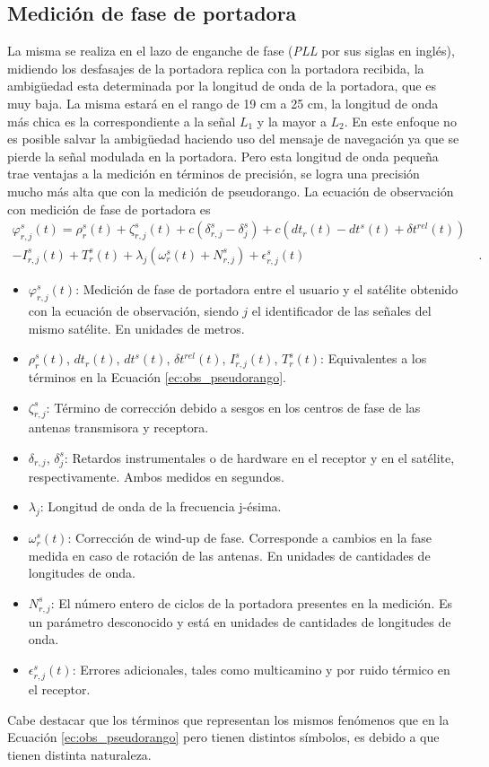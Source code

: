 \documentclass[a4paper,12pt,oneside,onecolumn,final,openright]{book}%
\begin{document}
\subsection{Medición de fase de portadora}%
	La misma se realiza en el lazo de enganche de fase (\textit{PLL} por sus siglas en inglés), midiendo los desfasajes de la portadora replica con la portadora recibida, la ambigüedad esta determinada por la longitud de onda de la portadora, que es muy baja. La misma estará en el rango de 19 cm a 25 cm, la longitud de onda más chica es la correspondiente a la señal $L_1$ y la mayor a $L_2$. En este enfoque no es posible salvar la ambigüedad haciendo uso del mensaje de navegación ya que se pierde la señal modulada en la portadora. Pero esta longitud de onda pequeña trae ventajas a la medición en términos de precisión, se logra una precisión mucho más alta que con la medición de pseudorango. La ecuación de observación con medición de fase de portadora es
\begin{align}\label{ec:obs_fasedep}
	\varphi _{r,j}^s(t) = \rho_r^s(t) + \zeta_{r,j}^s(t) + c\left( \delta_{r,j}^s - \delta_j^s \right) + c\left( dt_r(t) - dt^s(t) + \delta t^{rel}(t)\right) &\\ 
	- I_{r,j}^s(t) + T_r^s(t) + \lambda_j \left( \omega_r^s(t) + N_{r,j}^s \right) + \epsilon_{r,j}^s(t)& \ . \nonumber
\end{align}
\begin{itemize}
	\item $\varphi _{r,j}^s(t)$: Medición de fase de portadora entre el usuario y el satélite obtenido con la ecuación de observación, siendo $j$ el identificador de las señales del mismo satélite. En unidades de metros.
	\item $\rho_r^s(t)$, $dt_r(t)$, $dt^s(t)$, $\delta t^{rel}(t)$, $I_{r,j}^s(t)$, $T_r^s(t)$: Equivalentes a los términos en la Ecuación \ref{ec:obs_pseudorango}.
	\item $\zeta_{r,j}^s$: Término de corrección debido a sesgos en los centros de fase de las antenas transmisora y receptora.
	\item $\delta_{r,j}$, $\delta_j^s$: Retardos instrumentales o de hardware en el receptor y en el satélite, respectivamente. Ambos medidos en segundos.
	\item $\lambda_j$: Longitud de onda de la frecuencia j-ésima.
	\item $\omega_r^s(t)$: Corrección de wind-up de fase. Corresponde a cambios en la fase medida en caso de rotación de las antenas. En unidades de cantidades de longitudes de onda.
	\item $N_{r,j}^s$: El número entero de ciclos de la portadora presentes en la medición. Es un parámetro desconocido y está en unidades de cantidades de longitudes de onda.
	\item $\epsilon_{r,j}^s(t)$: Errores adicionales, tales como multicamino y por ruido térmico en el receptor.
\end{itemize}
Cabe destacar que los términos que representan los mismos fenómenos que en la Ecuación \ref{ec:obs_pseudorango} pero tienen distintos símbolos, es debido a que tienen distinta naturaleza. 
\end{document}
